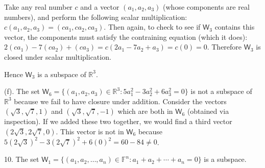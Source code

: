 \documentclass[11pt]{article}
\newcommand{\br}[1]{\left(#1\right)}
\newcommand{\cbr}[1]{\{#1\}}
\begin{document}
Take any real number $c$ and a vector $\br{a_1,a_2,a_3}$ (whose components are real numbers), and perform the following scalar multiplication: $c\br{a_1,a_2,a_3} = \br{ca_1,ca_2,ca_3}$. Then again, to check to see if $\mathsf{W}_3$ contains this vector, the components must satisfy the contraining equation (which it does): $2(ca_1)-7(ca_2)+(ca_3) = c\br{2a_1-7a_2+a_3}= c\br{0} = 0$. Therefore $\mathsf{W}_3$ is closed under scalar multiplication.

Hence $\mathsf{W}_3$ is a subspace of $\mathbb{R}^3$.

(f). The set $\mathsf{W}_6 = \cbr{\br{a_1,a_2,a_3}\in\mathbb{R}^3 : 5a_1^2-3a_2^2+6a_3^2 = 0}$ is not a subspace of $\mathbb{R}^3$ because we fail to have closure under addition. Consider the vectors $\br{\sqrt{3}, \sqrt{7}, 1}$ and $\br{\sqrt{3}, \sqrt{7}, -1}$ which are both in $\mathsf{W}_6$ (obtained via inspection). If we added these two together, we would find a third vector $\br{2\sqrt{3}, 2\sqrt{7}, 0}$. This vector is not in $\mathsf{W}_6$ because $5\br{2\sqrt{3}}^2-3\br{2\sqrt{7}}^2+6\br{0}^2 = 60-84 \neq 0$.

10. The set $\mathsf{W}_1 = \cbr{\br{a_1,a_2,\dots, a_n}\in\mathbb{F}^n : a_1+a_2+\cdots + a_n = 0}$ is a subspace.
\end{document}
